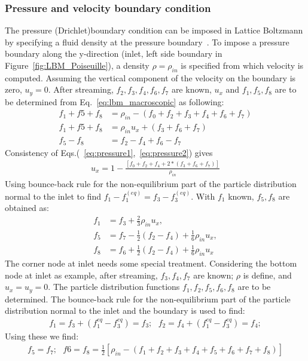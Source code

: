 \subsubsection*{Pressure and velocity boundary condition}
The pressure (Drichlet)boundary condition can be imposed in Lattice Boltzmann by specifying a fluid density at the pressure boundary~\citep{Zou1997}. To impose a pressure boundary along the y-direction (inlet, left side boundary in Figure~\ref{fig:LBM_Poiseuille}), a density $\rho = \rho_{in}$ is specified from which velocity is computed. Assuming the vertical component of the velocity on the boundary is zero, $u_y=0$. After streaming, $f_2, f_3, f_4, f_6, f_7$ are known, $u_x$ and $f_1, f_5, f_8$ are to be determined from Eq.~\ref{eq:lbm_macroscopic} as following:
\begin{align}
f_1+f5+f_8 & =  \rho_{in} - (f_0+f_2+f_3+f_4+f_6+f_7) \label{eq:pressure1}\\
f_1+f5+f_8 & =  \rho_{in}u_x + (f_3+f_6+f_7) \label{eq:pressure2} \\
f_5 - f_8  & =  f_2 - f_4 +f_6 -f_7
\end{align}
\flushleft Consistency of Eqs.(~\ref{eq:pressure1},~\ref{eq:pressure2}) gives
\begin{align}
u_x = 1 - \frac{[f_0+f_2+f_4+2*(f_3+f_6+f_7)]}{\rho_{in}}
\end{align}
Using bounce-back rule for the non-equilibrium part of the particle distribution normal to the inlet to find $f_1 -f_1^(eq) = f_3 -f_3^(eq)$. With $f_1$ known, $f_5,f_8$ are obtained as:
\begin{align}
f_1 & = f_3 + \frac{2}{3} \rho_{in}u_x, \nonumber \\ 
f_5 & = f_7 - \frac{1}{2}(f_2 - f_4) + \frac{1}{6}\rho_{in}u_x,\nonumber \\ 
f_8 & = f_6 + \frac{1}{2}(f_2 - f_4) + \frac{1}{6}\rho_{in}u_x
\end{align}
The corner node at inlet needs some special treatment. Considering the bottom node at inlet as example, after streaming, $f_3, f_4, f_7$ are known; $\rho$ is define, and $u_x = u_y = 0$. The particle distribution functions $f_1, f_2, f_5, f_6, f_8$ are to be determined. The bounce-back rule for the non-equilibrium part of the particle distribution normal to the inlet and the boundary is used to find:
\begin{align}
f_1 = f_3 + (f_1^{eq}-f_3^{eq}) = f_3;\mbox{ }f_2= f_4 + (f_1^{eq}-f_3^{eq}) = f_4; 
\end{align}
\flushleft Using these we find: 
\begin{align}
f_5 = f_7; \mbox{  }f6 = f_8 = \frac{1}{2}[\rho_{in} - (f_1 + f_2 + f_3 + f_4 + f_5 + f_6 + f_7 + f_8)]
\end{align}
